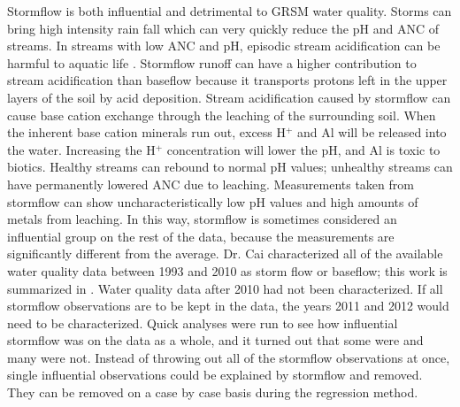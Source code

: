 Stormflow is both influential and detrimental  to GRSM water quality. 
Storms can bring high intensity rain fall which can very quickly reduce the pH and ANC of streams. 
In streams with low ANC and pH, episodic stream acidification can be harmful to aquatic life \citep{neff2009physiological}.  
Stormflow runoff can have a higher contribution to stream acidification than baseflow because it transports protons left in the upper layers of the soil by acid deposition. 
Stream acidification caused by stormflow can cause base cation exchange through the leaching of the surrounding soil. 
When the inherent base cation minerals run out, excess H$^+$ and Al will be released into the water. 
Increasing the H$^+$ concentration will lower the pH, and Al is toxic to biotics. 
Healthy streams can rebound to normal pH values; unhealthy streams can have permanently lowered ANC due to leaching.  
Measurements taken from stormflow can show uncharacteristically low pH values and high amounts of metals from leaching. 
In this way, stormflow is sometimes considered an influential group on the rest of the data, because the measurements are significantly different from the average. 
Dr. Cai characterized all of the available water quality data between 1993 and 2010 as storm flow or baseflow; this work is summarized in \citet{cai2012}. 
Water quality data after 2010 had not been characterized. 
If all stormflow observations are to be kept in the data, the years 2011 and 2012 would need to be characterized. 
Quick analyses were run to see how influential stormflow was on the data as a whole, and it turned out that some were and many were not. 
Instead of throwing out all of the stormflow observations at once, single influential observations could be explained by stormflow and removed. 
They can be removed on a case by case basis during the regression method.

